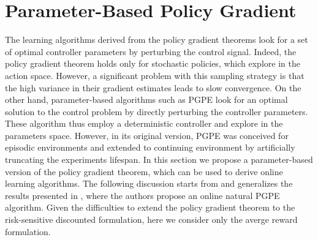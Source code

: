 \chapter{Parameter-Based Policy Gradient}
\label{ch:parameter_based_policy_gradient}

The learning algorithms derived from the policy gradient theorems look for a set of optimal controller parameters by perturbing the control signal. Indeed, the policy gradient theorem holds only for stochastic policies, which explore in the action space.
However, a significant problem with this sampling strategy is that the high variance in their gradient estimates leads to slow convergence. On the other hand, parameter-based algorithms such as PGPE look for an optimal solution to the control problem by directly perturbing the controller parameters. These algorithm thus employ a deterministic controller and explore in the parameters space. However, in its original version, PGPE was conceived for episodic environments and extended to continuing environment by artificially truncating the experiments lifespan. In this section we propose a parameter-based version of the policy gradient theorem, which can be used to derive online learning algorithms. The following discussion starts from and generalizes the results presented in \cite{miyamae2010natural}, where the authors propose an online natural PGPE algorithm. Given the difficulties to extend the policy gradient theorem to the risk-sensitive discounted formulation, here we consider only the averge reward formulation. 

